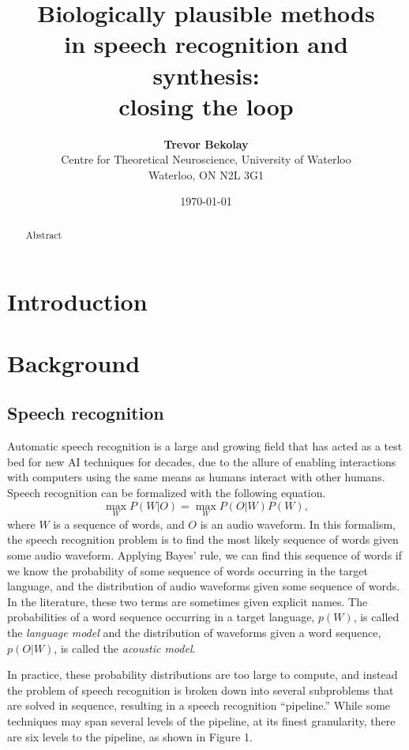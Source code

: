 \documentclass{article}
\title{\bf Biologically plausible methods \\
  in speech recognition and synthesis: \\
  closing the loop}
\date{\today}
\author{{\bf Trevor Bekolay} \\
  Centre for Theoretical Neuroscience, University of Waterloo \\
  Waterloo, ON  N2L 3G1}
\begin{document}
\maketitle

\begin{abstract}
  Abstract
\end{abstract}

\section{Introduction}

\section{Background}

\subsection{Speech recognition}

Automatic speech recognition
is a large and growing field
that has acted as a test bed
for new AI techniques for decades,
due to the allure of enabling
interactions with computers
using the same means
as humans interact with other humans.
Speech recognition can be formalized
with the following equation.
\begin{equation}
  \max_W P(W|O) = \max_W P(O|W) P(W),
\end{equation}
where $W$ is a sequence of words,
and $O$ is an audio waveform.
In this formalism, the speech recognition problem
is to find the most likely sequence of words
given some audio waveform.
Applying Bayes' rule, we can find
this sequence of words
if we know the probability
of some sequence of words occurring
in the target language,
and the distribution of audio waveforms
given some sequence of words.
In the literature, these two terms
are sometimes given explicit names.
The probabilities of a word sequence
occurring in a target language,
$p(W)$, is called the \textit{language model}
and the distribution of waveforms
given a word sequence, $p(O|W)$,
is called the \textit{acoustic model}.

In practice, these probability distributions
are too large to compute,
and instead the problem of speech recognition
is broken down into several subproblems
that are solved in sequence,
resulting in a speech recognition ``pipeline.''
While some techniques may span several levels
of the pipeline, at its finest granularity,
there are six levels to the pipeline,
as shown in Figure 1.
\end{document}
